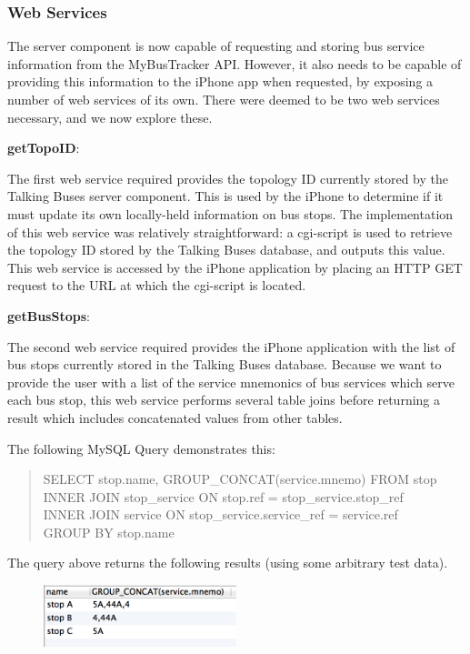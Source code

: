 \documentclass[10pt,twocolumn]{article}
\begin{document}
\subsubsection{Web Services}
The server component is now capable of requesting and storing bus service information from the MyBusTracker API. However, it also needs to be capable of providing this information to the iPhone app when requested, by exposing a number of web services of its own.  There were deemed to be two web services necessary, and we now explore these.

\textbf{getTopoID}:

The first web service required provides the topology ID currently stored by the Talking Buses server component. This is used by the iPhone to determine if it must update its own locally-held information on bus stops. The implementation of this web service was relatively straightforward: a cgi-script is used to retrieve the topology ID stored by the Talking Buses database, and outputs this value. This web service is accessed by the iPhone application by placing an HTTP GET request to the URL at which the cgi-script is located.

\textbf{getBusStops}:

The second web service required provides the iPhone application with the list of bus stops currently stored in the Talking Buses database. Because we want to provide the user with a list of the service mnemonics of bus services which serve each bus stop, this web service performs several table joins before returning a result which includes concatenated values from other tables.

The following MySQL Query demonstrates this:
\begin{quote}
SELECT stop.name, GROUP\_CONCAT(service.mnemo) FROM stop\\
INNER JOIN stop\_service ON stop.ref = stop\_service.stop\_ref\\
INNER JOIN service ON stop\_service.service\_ref = service.ref\\
GROUP BY stop.name\\
\end{quote}

The query above returns the following results (using some arbitrary test data).
\begin{figure}[htbp]
    \centering
    \includegraphics[width=0.5\textwidth]{join}
\end{figure}
\end{document}
